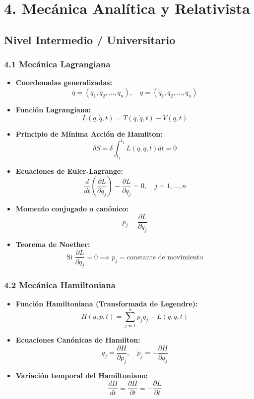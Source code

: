\documentclass[11pt,a4paper]{article}
\begin{document}
\section*{4. Mecánica Analítica y Relativista}

\subsection*{Nivel Intermedio / Universitario}

\subsubsection*{4.1 Mecánica Lagrangiana}

\begin{itemize}
  \item \textbf{Coordenadas generalizadas:}
  \[
    q = (q_1, q_2, \dots, q_n), \quad \dot{q} = (\dot{q}_1, \dot{q}_2, \dots, \dot{q}_n)
  \]
  \item \textbf{Función Lagrangiana:}
  \[
    L(q, \dot{q}, t) = T(q, \dot{q}, t) - V(q, t)
  \]
  \item \textbf{Principio de Mínima Acción de Hamilton:}
  \[
    \delta S = \delta \int_{t_1}^{t_2} L(q, \dot{q}, t) dt = 0
  \]
  \item \textbf{Ecuaciones de Euler-Lagrange:}
  \[
    \frac{d}{dt}\left( \frac{\partial L}{\partial \dot{q}_j} \right) - \frac{\partial L}{\partial q_j} = 0, \quad j = 1, \dots, n
  \]
  \item \textbf{Momento conjugado o canónico:}
  \[
    p_j = \frac{\partial L}{\partial \dot{q}_j}
  \]
  \item \textbf{Teorema de Noether:}
  \[
    \text{Si } \frac{\partial L}{\partial q_j} = 0 \implies p_j = \text{constante de movimiento}
  \]
\end{itemize}

\subsubsection*{4.2 Mecánica Hamiltoniana}

\begin{itemize}
  \item \textbf{Función Hamiltoniana (Transformada de Legendre):}
  \[
    H(q, p, t) = \sum_{j=1}^n p_j \dot{q}_j - L(q, \dot{q}, t)
  \]
  \item \textbf{Ecuaciones Canónicas de Hamilton:}
  \[
    \dot{q}_j = \frac{\partial H}{\partial p_j}, \quad \dot{p}_j = -\frac{\partial H}{\partial q_j}
  \]
  \item \textbf{Variación temporal del Hamiltoniano:}
  \[
    \frac{dH}{dt} = \frac{\partial H}{\partial t} = -\frac{\partial L}{\partial t}
  \]
\end{itemize}
\end{document}
